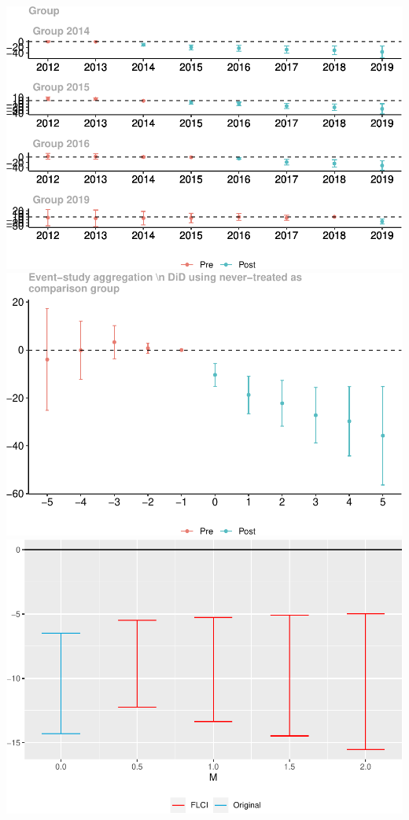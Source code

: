 \documentclass[
]{article}
\begin{document}
\includegraphics{Report_files/figure-latex/Figures-7.pdf}
\includegraphics{Report_files/figure-latex/Figures-8.pdf}
\includegraphics{Report_files/figure-latex/Figures-9.pdf}
\end{document}
